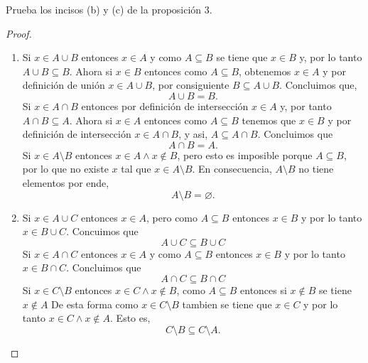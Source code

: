 \documentclass[12pt,a4paper]{article}
\begin{document}
        
    \thispagestyle{empty}
    

    \begin{problema}
        Prueba los incisos (b) y (c) de la proposición 3.
    \end{problema}

    \begin{proof}
        \begin{enumerate}
            \item[(b)] Si $x\in A\cup B$ entonces $x\in A$ y como $A\subseteq B$ se tiene que $x\in B$ y, por lo tanto
            $A\cup B\subseteq B$. Ahora si $x\in B$ entonces como $A\subseteq B$, obtenemos $x\in A$ y por definición de unión
            $x\in A\cup B$, por consiguiente $B\subseteq A\cup B$. Concluimos que,
            \begin{equation*}
                A\cup B=B.
            \end{equation*}
            Si $x\in A\cap B$ entonces por definición de intersección $x\in A$ y, por tanto $A\cap B\subseteq A$. Ahora si $x\in A$ entonces como $A\subseteq B$
            tenemos que $x\in B$ y por definición de intersección $x\in A\cap B$, y asi, $A\subseteq A\cap B$.
            Concluimos que
            \begin{equation*}
                A\cap B=A.
            \end{equation*}
            Si $x\in A\setminus B$ entonces $x\in A\wedge x\notin B$, pero esto es imposible porque $A\subseteq B$, por lo que no existe $x$
            tal que $x\in A\setminus B$. En consecuencia, $A\setminus B$ no tiene elementos por ende,
            \begin{equation*}
                A\setminus B=\varnothing.
            \end{equation*}
            \item[(c)] Si $x\in A\cup C$ entonces $x\in A$, pero como $A\subseteq B$ entonces $x\in B$ y por lo tanto
            $x\in B\cup C$. Concuimos que
            \begin{equation*}
                A\cup C\subseteq B\cup C
            \end{equation*}
            Si $x\in A\cap C$ entonces $x\in A$ y como $A\subseteq B$ entonces $x\in B$ y por lo tanto $x\in B\cap C$. Concluimos que
            \begin{equation*}
                A\cap C\subseteq B\cap C
            \end{equation*}
            Si $x\in C\setminus B$ entonces $x\in C\wedge x\notin B$, como $A\subseteq B$ entonces si $x\notin B$ se tiene $x\notin A$
            De esta forma como $x\in C\setminus B$ tambien se tiene que $x\in C$ y por lo tanto $x\in C\wedge x\notin A$. Esto es,
            \begin{equation*}
                C\setminus B\subseteq C\setminus A.
            \end{equation*}
        \end{enumerate}
    \end{proof}
\end{document}
